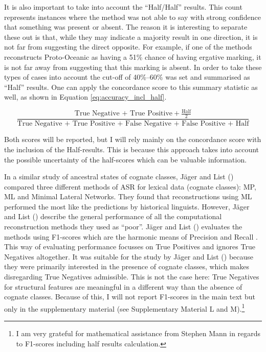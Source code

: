 \documentclass[12pt,letterpaper]{article}
\begin{document}
It is also important to take into account the ``Half/Half'' results. This count represents instances where the method was not able to say with strong confidence that something was present or absent. The reason it is interesting to separate these out is that, while they may indicate a majority result in one direction, it is not far from suggesting the direct opposite. For example, if one of the methods reconstructs Proto-Oceanic as having a 51\% chance of having ergative marking, it is not far away from suggesting that this marking is absent. In order to take these types of cases into account the cut-off of 40\%--60\% was set and summarised as ``Half'' results. One can apply the concordance score to this summary statistic as well, as shown in Equation \eqref{eq:accuracy_incl_half}. 

\begin{equation}\label{eq:accuracy_incl_half}
\frac{\text{True Negative + True Positive} + \frac{\text{Half}}{2}}{\text{True Negative + True Positive + False Negative + False Positive + Half}}
\end{equation}

Both scores will be reported, but I will rely mainly on the concordance score with the inclusion of the Half-results. This is because this approach takes into account the possible uncertainty of the half-scores which can be valuable information.

In a similar study of ancestral states of cognate classes, J\"ager and List (\citeyear{jager2018using}) compared three different methods of ASR for lexical data (cognate classes): MP, ML and Minimal Lateral Networks. They found that reconstructions using ML performed the most like the predictions by historical linguists. However, J\"ager and List (\citeyear{jager2018using}) describe the general performance of all the computational reconstruction methods they used as ``poor''. J\"ager and List (\citeyear{jager2018using}) evaluates the methods using F1-scores which are the harmonic means of Precision and Recall \citep{sasaki2007truth}. This way of evaluating performance focusses on True Positives and ignores True Negatives altogether. It was suitable for the study by J\"ager and List (\citeyear{jager2018using}) because they were primarily interested in the presence of cognate classes, which makes disregarding True Negatives admissible. This is not the case here: True Negatives for structural features are meaningful in a different way than the absence of cognate classes. Because of this, I will not report F1-scores in the main text but only in the supplementary material (see Supplementary Material L and M).\footnote{I am very grateful for mathematical assistance from Stephen Mann in regards to F1-scores including half results calculation.} %
\end{document}
